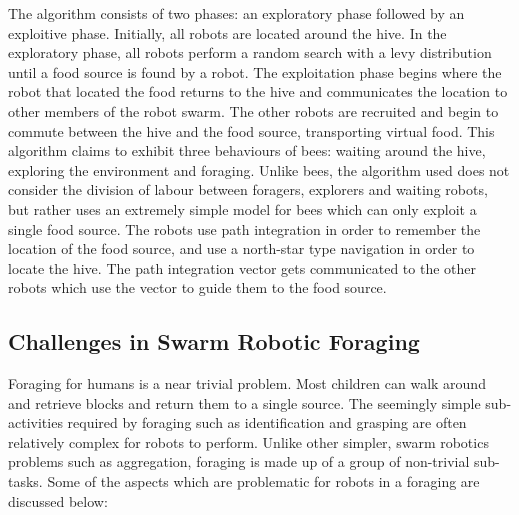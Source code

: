 The algorithm consists of two phases: an exploratory phase followed by an exploitive phase. Initially, all robots are located around the hive. In the exploratory phase, all robots perform a random search with a levy distribution until a food source is found by a robot. The exploitation phase begins where the robot that located the food returns to the hive and communicates the location to other members of the robot swarm. The other robots are recruited and begin to commute between the hive and the food source, transporting virtual food. This algorithm claims to exhibit three behaviours of bees: waiting around the hive, exploring the environment and foraging. Unlike bees, the algorithm used does not consider the division of labour between foragers, explorers and waiting robots, but rather uses an extremely simple model for bees which can only exploit a single food source. The robots use path integration in order to remember the location of the food source, and use a north-star type navigation in order to locate the hive. The path integration vector gets communicated to the other robots which use the vector to guide them to the food source. 


\subsection{Challenges in Swarm Robotic Foraging}
\label{challengesinforaging}

Foraging for humans is a near trivial problem. Most children can walk around and retrieve blocks and return them to a single source. The seemingly simple sub-activities required by foraging such as identification and grasping are often relatively complex for robots to perform. Unlike other simpler, swarm robotics problems such as aggregation, foraging is made up of a group of non-trivial sub-tasks. Some of the aspects which are problematic for robots in a foraging are discussed below:

